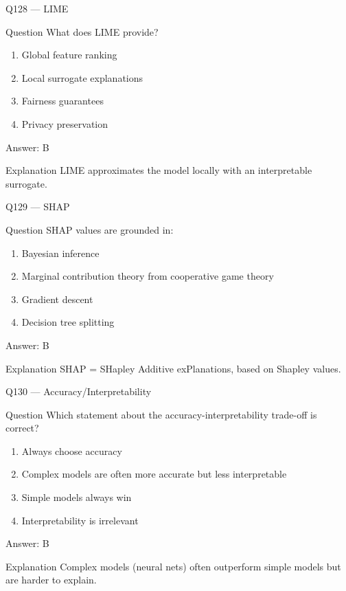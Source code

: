 \documentclass[aspectratio=169,8pt]{beamer}
\begin{document}
	\begin{frame}{Q128 --- LIME}
		\begin{block}{Question}
			What does LIME provide?
		\end{block}
		\begin{enumerate}
			\item Global feature ranking
			\item Local surrogate explanations
			\item Fairness guarantees
			\item Privacy preservation
		\end{enumerate}
		\begin{exampleblock}{Answer: B}\end{exampleblock}
		\begin{block}{Explanation}
			LIME approximates the model locally with an interpretable surrogate.
		\end{block}
	\end{frame}
	
	\begin{frame}{Q129 --- SHAP}
		\begin{block}{Question}
			SHAP values are grounded in:
		\end{block}
		\begin{enumerate}
			\item Bayesian inference
			\item Marginal contribution theory from cooperative game theory
			\item Gradient descent
			\item Decision tree splitting
		\end{enumerate}
		\begin{exampleblock}{Answer: B}\end{exampleblock}
		\begin{block}{Explanation}
			SHAP = SHapley Additive exPlanations, based on Shapley values.
		\end{block}
	\end{frame}
	
	\begin{frame}{Q130 --- Accuracy/Interpretability}
		\begin{block}{Question}
			Which statement about the accuracy-interpretability trade-off is correct?
		\end{block}
		\begin{enumerate}
			\item Always choose accuracy
			\item Complex models are often more accurate but less interpretable
			\item Simple models always win
			\item Interpretability is irrelevant
		\end{enumerate}
		\begin{exampleblock}{Answer: B}\end{exampleblock}
		\begin{block}{Explanation}
			Complex models (neural nets) often outperform simple models but are harder to explain.
		\end{block}
	\end{frame}
	
\end{document}
